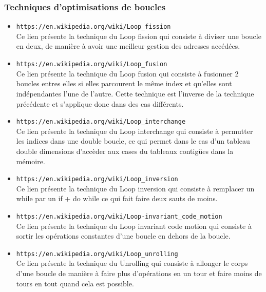 \documentclass[a4paper]{article}
\begin{document}
\subsubsection{Techniques d'optimisations de boucles}
\begin{itemize}
\item \texttt{https://en.wikipedia.org/wiki/Loop\_fission} \\
Ce lien présente la technique du Loop fission qui consiste à diviser une boucle en deux, de manière à avoir une meilleur gestion des adresses accédées.\\

\item \texttt{https://en.wikipedia.org/wiki/Loop\_fusion} \\
Ce lien présente la technique du Loop fusion qui consiste à fusionner 2 boucles entres elles si elles parcourent le même index et qu'elles sont indépendantes l'une de l'autre. Cette technique est l'inverse de la technique précédente et s'applique donc dans des cas différents.\\

\item \texttt{https://en.wikipedia.org/wiki/Loop\_interchange} \\
Ce lien présente la technique du Loop interchange qui consiste à permutter les indices dans une double boucle, ce qui permet dans le cas d'un tableau double dimensions d'accèder aux cases du tableaux contigües dans la mémoire.\\

\item \texttt{https://en.wikipedia.org/wiki/Loop\_inversion} \\
Ce lien présente la technique du Loop inversion qui consiste à remplacer un while par un if + do while ce qui fait faire deux sauts de moins.\\
 
\item \texttt{https://en.wikipedia.org/wiki/Loop-invariant\_code\_motion} \\
Ce lien présente la technique du Loop invariant code motion qui consiste à sortir les opérations constantes d'une boucle en dehors de la boucle.\\

\item \texttt{https://en.wikipedia.org/wiki/Loop\_unrolling} \\
Ce lien présente la technique du Unrolling qui consiste à allonger le corps d'une boucle de manière à faire plus d'opérations en un tour et faire moins de tours en tout quand cela est possible.\\


\end{itemize}
\end{document}
